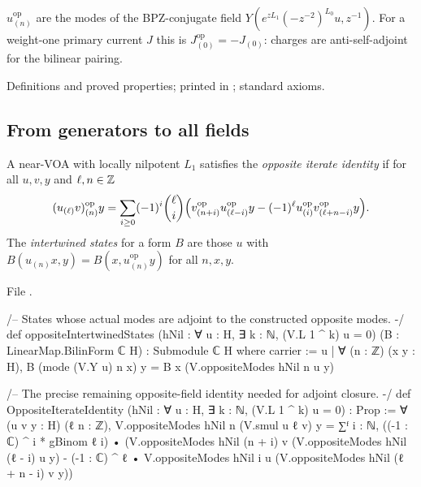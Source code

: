 \begin{physics}
$u^{\mathrm{op}}_{(n)}$ are the modes of the BPZ-conjugate field $Y(e^{zL_1}(-z^{-2})^{L_0}u,z^{-1})$.  For a weight-one primary
current $J$ this is $J^{\mathrm{op}}_{(0)}=-J_{(0)}$: charges are anti-self-adjoint for the bilinear pairing.
\end{physics}

\begin{status}
Definitions and proved properties; printed in ; standard axioms.
\end{status}

\subsection{From generators to all fields}

\begin{definition}\label{ch17:def:oppiterate}
A near-VOA with locally nilpotent $L_1$ satisfies the \emph{opposite iterate identity} if for all $u,v,y$ and $\ell,n\in{\mathbb{Z}}$
\begin{equation*}
  (u_{(\ell)}v)^{\mathrm{op}}_{(n)}y=\sum_{i\ge0}(-1)^i\binom\ell i\Bigl(v^{\mathrm{op}}_{(n+i)}u^{\mathrm{op}}_{(\ell-i)}y-(-1)^\ell u^{\mathrm{op}}_{(i)}v^{\mathrm{op}}_{(\ell+n-i)}y\Bigr).
\end{equation*}
The \emph{intertwined states} for a form $B$ are those $u$ with $B(u_{(n)}x,y)=B(x,u^{\mathrm{op}}_{(n)}y)$ for all $n,x,y$.
\end{definition}

\noindent File .
\begin{leancode}
/-- States whose actual modes are adjoint to the constructed opposite modes. -/
def oppositeIntertwinedStates (hNil : ∀ u : H, ∃ k : ℕ, (V.L 1 ^ k) u = 0)
    (B : LinearMap.BilinForm ℂ H) : Submodule ℂ H where
  carrier := {u | ∀ (n : ℤ) (x y : H),
    B (mode (V.Y u) n x) y = B x (V.oppositeModes hNil n u y)}

/-- The precise remaining opposite-field identity needed for adjoint closure. -/
def OppositeIterateIdentity (hNil : ∀ u : H, ∃ k : ℕ, (V.L 1 ^ k) u = 0) : Prop :=
  ∀ (u v y : H) (ℓ n : ℤ),
    V.oppositeModes hNil n (V.smul u ℓ v) y =
      ∑ᶠ i : ℕ, ((-1 : ℂ) ^ i * gBinom ℓ i) •
        (V.oppositeModes hNil (n + i) v (V.oppositeModes hNil (ℓ - i) u y) -
          (-1 : ℂ) ^ ℓ • V.oppositeModes hNil i u
            (V.oppositeModes hNil (ℓ + n - i) v y))
\end{leancode}

